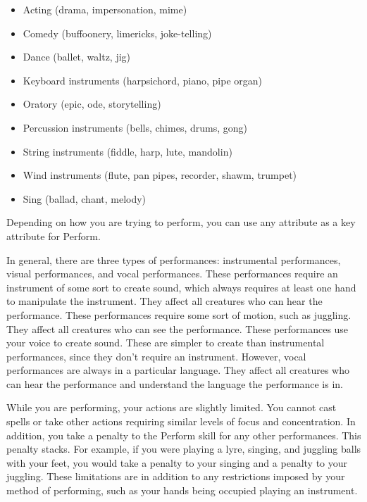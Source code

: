         \begin{itemize}
            \item Acting (drama, impersonation, mime)
            \item Comedy (buffoonery, limericks, joke-telling)
            \item Dance (ballet, waltz, jig)
            \item Keyboard instruments (harpsichord, piano, pipe organ)
            \item Oratory (epic, ode, storytelling)
            \item Percussion instruments (bells, chimes, drums, gong)
            \item String instruments (fiddle, harp, lute, mandolin)
            \item Wind instruments (flute, pan pipes, recorder, shawm, trumpet)
            \item Sing (ballad, chant, melody)
        \end{itemize}

        Depending on how you are trying to perform, you can use any attribute as a key attribute for Perform.

        In general, there are three types of performances: instrumental performances, visual performances, and vocal performances.
         These performances require an instrument of some sort to create sound, which always requires at least one hand to manipulate the instrument.
        They affect all creatures who can hear the performance.
         These performances require some sort of motion, such as juggling.
        They affect all creatures who can see the performance.
         These performances use your voice to create sound.
        These are simpler to create than instrumental performances, since they don't require an instrument.
        However, vocal performances are always in a particular language.
        They affect all creatures who can hear the performance and understand the language the performance is in.

        While you are performing, your actions are slightly limited.
        You cannot cast spells or take other actions requiring similar levels of focus and concentration.
        In addition, you take a  penalty to the Perform skill for any other performances.
        This penalty stacks.
        For example, if you were playing a lyre, singing, and juggling balls with your feet, you would take a  penalty to your singing and a  penalty to your juggling.
        These limitations are in addition to any restrictions imposed by your method of performing, such as your hands being occupied playing an instrument.

